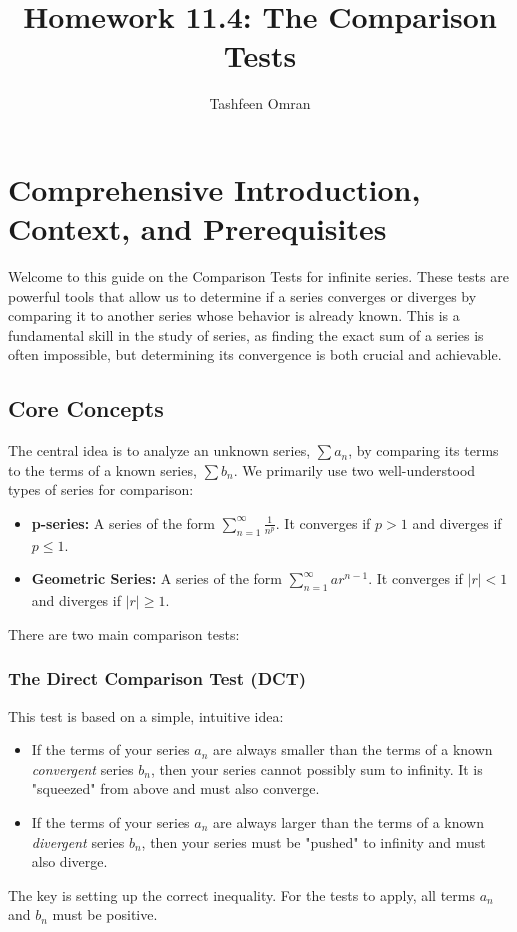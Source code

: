 \documentclass{article}
\title{Homework 11.4: The Comparison Tests}
\author{Tashfeen Omran}
\date{\November 2025}
\begin{document}
\maketitle

\section{Comprehensive Introduction, Context, and Prerequisites}

Welcome to this guide on the Comparison Tests for infinite series. These tests are powerful tools that allow us to determine if a series converges or diverges by comparing it to another series whose behavior is already known. This is a fundamental skill in the study of series, as finding the exact sum of a series is often impossible, but determining its convergence is both crucial and achievable.

\subsection{Core Concepts}

The central idea is to analyze an unknown series, \(\sum a_n\), by comparing its terms to the terms of a known series, \(\sum b_n\). We primarily use two well-understood types of series for comparison:
\begin{itemize}
    \item \textbf{p-series:} A series of the form \(\sum_{n=1}^{\infty} \frac{1}{n^p}\). It converges if \(p > 1\) and diverges if \(p \leq 1\).
    \item \textbf{Geometric Series:} A series of the form \(\sum_{n=1}^{\infty} ar^{n-1}\). It converges if \(|r| < 1\) and diverges if \(|r| \geq 1\).
\end{itemize}

There are two main comparison tests:

\subsubsection{The Direct Comparison Test (DCT)}
This test is based on a simple, intuitive idea:
\begin{itemize}
    \item If the terms of your series \(a_n\) are always smaller than the terms of a known \textit{convergent} series \(b_n\), then your series cannot possibly sum to infinity. It is "squeezed" from above and must also converge.
    \item If the terms of your series \(a_n\) are always larger than the terms of a known \textit{divergent} series \(b_n\), then your series must be "pushed" to infinity and must also diverge.
\end{itemize}
The key is setting up the correct inequality. For the tests to apply, all terms \(a_n\) and \(b_n\) must be positive.
\end{document}
